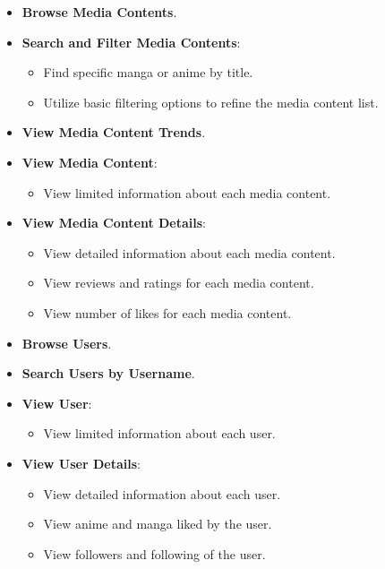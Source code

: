 \begin{itemize}
    \item \textbf{Browse Media Contents}.
    
    \item \textbf{Search and Filter Media Contents}:
    \begin{itemize}
        \item Find specific manga or anime by title.
        \item Utilize basic filtering options to refine the media content list.
    \end{itemize}
    
    \item \textbf{View Media Content Trends}.
    
    \item \textbf{View Media Content}:
    \begin{itemize}
        \item View limited information about each media content.
    \end{itemize} 
    
    \item \textbf{View Media Content Details}:
    \begin{itemize}
        \item View detailed information about each media content.
        \item View reviews and ratings for each media content.
        \item View number of likes for each media content.
    \end{itemize}
    
    \item \textbf{Browse Users}.
    
    \item \textbf{Search Users by Username}.
    
    \item \textbf{View User}:
    \begin{itemize}
        \item View limited information about each user.
    \end{itemize} 
    
    \item \textbf{View User Details}:
    \begin{itemize}
        \item View detailed information about each user.
        \item View anime and manga liked by the user.
        \item View followers and following of the user.
    \end{itemize}
\end{itemize}

